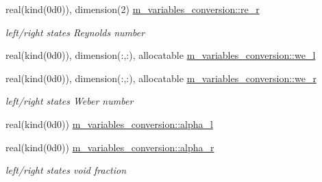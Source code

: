 \begin{Indent}
\begin{DoxyCompactItemize}
\item 
real(kind(0d0)), dimension(2) \hyperlink{namespacem__variables__conversion_aea8ad83f5633509287326ea1a428cb89}{m\+\_\+variables\+\_\+conversion\+::re\+\_\+r}
\begin{DoxyCompactList}\small\item\em left/right states Reynolds number \end{DoxyCompactList}\item 
real(kind(0d0)), dimension(\+:,\+:), allocatable \hyperlink{namespacem__variables__conversion_a87022a7b6fc9b57912e4fca2d38bd0e2}{m\+\_\+variables\+\_\+conversion\+::we\+\_\+l}
\item 
real(kind(0d0)), dimension(\+:,\+:), allocatable \hyperlink{namespacem__variables__conversion_a0b984f6015e127568f82af37a3135ceb}{m\+\_\+variables\+\_\+conversion\+::we\+\_\+r}
\begin{DoxyCompactList}\small\item\em left/right states Weber number \end{DoxyCompactList}\item 
real(kind(0d0)) \hyperlink{namespacem__variables__conversion_a77bc35ccbac3dbf5e5a01e4e0219d301}{m\+\_\+variables\+\_\+conversion\+::alpha\+\_\+l}
\item 
real(kind(0d0)) \hyperlink{namespacem__variables__conversion_a5f8751544d985f9e8dba160437f72b12}{m\+\_\+variables\+\_\+conversion\+::alpha\+\_\+r}
\begin{DoxyCompactList}\small\item\em left/right states void fraction \end{DoxyCompactList}\end{DoxyCompactItemize}
\end{Indent}
